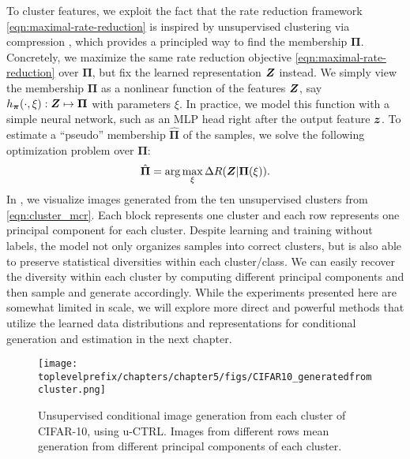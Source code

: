 \documentclass[../../book-main.tex]{subfiles}
\begin{document}
To cluster features, we exploit the fact that the rate reduction framework \eqref{eqn:maximal-rate-reduction} is inspired by unsupervised clustering via compression \cite{ma2007segmentation}, which provides a principled way to find the membership $\bm \Pi$.
Concretely, we maximize the same rate reduction objective \eqref{eqn:maximal-rate-reduction} over $\bm \Pi$, but fix the learned representation $\bm{Z}$ instead. We simply view the membership $\bm \Pi$ as a nonlinear function of the features $\bm{Z}$, say $h_{\bm \pi}(\cdot,\xi):\bm{Z} \mapsto \bm \Pi$ with parameters $\xi$. In practice, we model this function with a simple neural network, such as an MLP head right after the output feature $\bm{z}$. 
To estimate a ``pseudo'' membership $\hat{\bm \Pi}$ of the samples, we solve the following optimization problem over $\bm \Pi$:
\begin{align}
    \hat{\bm \Pi} = \arg\max_{\xi} \Delta R(\bm{Z}| \bm \Pi(\xi)).
\label{eqn:cluster_mcr}
\end{align}
In , we  visualize images generated from the ten unsupervised clusters from \eqref{eqn:cluster_mcr}. Each block represents one cluster and each row represents one principal component for each cluster. Despite learning and training without labels, the model not only organizes samples into correct clusters, but is also able to preserve statistical diversities within each cluster/class. We can easily recover the diversity within each cluster by computing different principal components and then sample and generate accordingly. While the experiments presented here are somewhat limited in scale, we will explore more direct and powerful methods that utilize the learned data distributions and representations for conditional generation and estimation in the next chapter.
\begin{figure}[t]
    \footnotesize
    \centering
    \texttt{[image: \\toplevelprefix/chapters/chapter5/figs/CIFAR10\_generatedfromcluster.png]}
    \caption{\small Unsupervised conditional image generation from each cluster of CIFAR-10, using u-CTRL. Images from different rows mean generation from different principal components of each cluster.}
    \label{fig:vis_clustering}
\end{figure}




\end{document}
